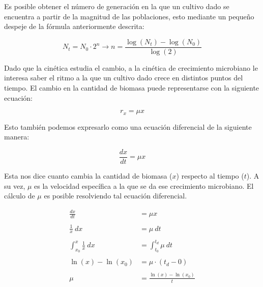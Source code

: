 Es posible obtener el número de generación en la que un cultivo dado se encuentra a partir de la magnitud de las poblaciones, esto mediante un pequeño despeje de la fórmula anteriormente descrita:

\begin{equation*}
    N_{t} = N_{0} \cdot 2^{n} \longrightarrow n = \frac{\log{(N_{t})} - \log(N_{0})}{\log(2)}
\end{equation*}

Dado que la cinética estudia el cambio, a la cinética de crecimiento microbiano le interesa saber el ritmo a la que un cultivo dado crece en distintos puntos del tiempo. El cambio en la cantidad de biomasa puede representarse con la siguiente ecuación:

\begin{equation*}
    r_{x} = \mu x
\end{equation*}

Esto también podemos expresarlo como una ecuación diferencial de la siguiente manera:

\begin{equation*}
    \frac{dx}{dt} = \mu x
\end{equation*}

Esta nos dice cuanto cambia la cantidad de biomasa ($x$) respecto al tiempo ($t$). A su vez, $\mu$ es la velocidad específica a la que se da ese crecimiento microbiano. El cálculo de $\mu$ es posible resolviendo tal ecuación diferencial.

\begin{align*}
    \frac{dx}{dt} &= \mu x
    \\
    \\
    \frac{1}{x} \ dx &= \mu \ dt
    \\
    \\
    \int_{x_{0}}^{x}{\frac{1}{x}} \ dx &= \int_{t_{0}}^{t_{d}}{\mu \ dt}
    \\
    \\
    \ln(x) - \ln(x_{0}) &= \mu \cdot (t_{d} - 0)
    \\
    \\
    \mu &= \frac{\ln(x) - \ln(x_{0})}{t}
\end{align*}